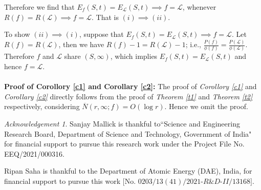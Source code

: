 \documentclass[a4paper,draft]{amsproc}
\theoremstyle{plain}
\theoremstyle{definition}
\theoremstyle{remark}
\newcommand{\ol}{\overline}
\renewcommand{\d}{\displaystyle}
\newtheorem*{ack}{Acknowledgement}
\numberwithin{equation}{section}
\begin{document}
Therefore we find that $E_f(S, t)=E_\mathcal{L}(S,t)\implies f=\mathcal{L}$, whenever $R(f)=R(\mathcal{L})\implies f=\mathcal{L}$. That is $(i)\implies(ii).$ 
\vspace{0.1in}\par To show $(ii) \implies (i)$, suppose that $E_f(S, t)=E_\mathcal{L}(S,t)\implies f=\mathcal{L}$.
Let $R(f)=R(\mathcal{L})$, then we have $R(f)-1=R(\mathcal{L})-1$; i.e., $\d\frac{P(f)}{\phi(f)}=\d\frac{P(\mathcal{L})}{\phi(\mathcal{L})}.$ Therefore  $f$ and  $\mathcal{L}$ share $(S,\infty)$, which implies $E_f(S, t)=E_\mathcal{L}(S,t)$ and hence  $f=\mathcal{L}$.
\\\\{\bf Proof of Corollory \ref{c1} and Corollary \ref{c2}:}	The proof of {\em Corollory \ref{c1}} and {\em Corollary \ref{c2}} directly follows from the proof of {\em Theorem \ref{t1}} and {\em Theorem \ref{t2}} respectively, considering $\ol N(r,\infty;f)=O(\log r)$. Hence we omit the proof.
\begin{ack}
\par Sanjay Mallick is thankful to``Science and Engineering Research Board, Department of Science and Technology, Government of India"  for financial support to pursue this research work under the Project File No. EEQ/2021/000316.
\par	 Ripan Saha is thankful to the Department of Atomic Energy (DAE), India, for financial support to pursue this work $[$No. $0203/13(41)/2021$-$R\&D$-$II/13168]$. 	
\end{ack}
\end{document}

